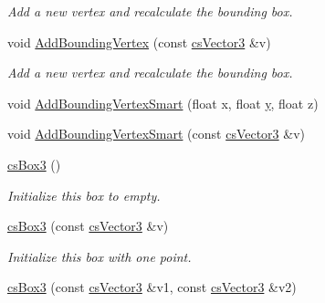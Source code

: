 \begin{DoxyCompactItemize}
\begin{DoxyCompactList}\small\item\em Add a new vertex and recalculate the bounding box. \end{DoxyCompactList}\item 
void \hyperlink{classcsBox3_a9afd44e57fa7ad90e6636029c570014d}{Add\+Bounding\+Vertex} (const \hyperlink{classcsVector3}{cs\+Vector3} \&v)\hypertarget{classcsBox3_a9afd44e57fa7ad90e6636029c570014d}{}\label{classcsBox3_a9afd44e57fa7ad90e6636029c570014d}

\begin{DoxyCompactList}\small\item\em Add a new vertex and recalculate the bounding box. \end{DoxyCompactList}\item 
void \hyperlink{classcsBox3_a9bb79f738a03a5b2713cbf4488048641}{Add\+Bounding\+Vertex\+Smart} (float x, float \hyperlink{IceUtils_8h_aa7ffaed69623192258fb8679569ff9ba}{y}, float z)
\item 
void \hyperlink{classcsBox3_afb321a08d1fa8449acb0205b9ca009e5}{Add\+Bounding\+Vertex\+Smart} (const \hyperlink{classcsVector3}{cs\+Vector3} \&v)
\item 
\hyperlink{classcsBox3_a470b19b9c15cb52381d58eeff54ed19b}{cs\+Box3} ()\hypertarget{classcsBox3_a470b19b9c15cb52381d58eeff54ed19b}{}\label{classcsBox3_a470b19b9c15cb52381d58eeff54ed19b}

\begin{DoxyCompactList}\small\item\em Initialize this box to empty. \end{DoxyCompactList}\item 
\hyperlink{classcsBox3_a026a5a0f026acad91c35b33293d21ccf}{cs\+Box3} (const \hyperlink{classcsVector3}{cs\+Vector3} \&v)\hypertarget{classcsBox3_a026a5a0f026acad91c35b33293d21ccf}{}\label{classcsBox3_a026a5a0f026acad91c35b33293d21ccf}

\begin{DoxyCompactList}\small\item\em Initialize this box with one point. \end{DoxyCompactList}\item 
\hyperlink{classcsBox3_ac707c7ef8d72029ae8995ed9bb1cd4b9}{cs\+Box3} (const \hyperlink{classcsVector3}{cs\+Vector3} \&v1, const \hyperlink{classcsVector3}{cs\+Vector3} \&v2)\hypertarget{classcsBox3_ac707c7ef8d72029ae8995ed9bb1cd4b9}{}\label{classcsBox3_ac707c7ef8d72029ae8995ed9bb1cd4b9}


\end{DoxyCompactItemize}
